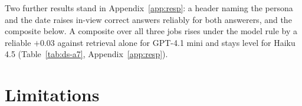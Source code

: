 \documentclass{article}
\begin{document}
Two further results stand in Appendix~\ref{app:resp}: a header naming the persona and the date raises in-view correct answers reliably for both answerers, and the composite below.
A composite over all three jobs rises under the model rule by a reliable $+0.03$ against retrieval alone for GPT-4.1 mini and stays level for Haiku 4.5 (Table~\ref{tab:ds-a7}, Appendix~\ref{app:resp}).



\section{Limitations}\label{sec:limitations}\label{sec:discussion}
\end{document}
